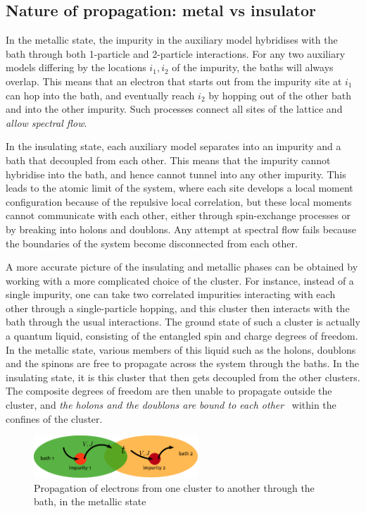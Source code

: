 \documentclass[10pt]{report}
\numberwithin{equation}{section}
\begin{document}
\subsection{Nature of propagation: metal vs insulator}
In the metallic state, the impurity in the auxiliary model hybridises with the bath through both 1-particle and 2-particle interactions. For any two auxiliary models differing by the locations \(i_1, i_2\) of the impurity, the baths will always overlap. This means that an electron that starts out from the impurity site at \(i_1\) can hop into the bath, and eventually reach \(i_2\) by hopping out of the other bath and into the other impurity. Such processes connect all sites of the lattice and \textit{allow spectral flow}.

In the insulating state, each auxiliary model separates into an impurity and a bath that decoupled from each other. This means that the impurity cannot hybridise into the bath, and hence cannot tunnel into any other impurity. This leads to the atomic limit of the system, where each site develops a local moment configuration because of the repulsive local correlation, but these local moments cannot communicate with each other, either through spin-exchange processes or by breaking into holons and doublons. Any attempt at spectral flow fails because the boundaries of the system become disconnected from each other.

A more accurate picture of the insulating and metallic phases can be obtained by working with a more complicated choice of the cluster. For instance, instead of a single impurity, one can take two correlated impurities interacting with each other through a single-particle hopping, and this cluster then interacts with the bath through the usual interactions. The ground state of such a cluster is actually a quantum liquid, consisting of the entangled spin and charge degrees of freedom. In the metallic state, various members of this liquid such as the holons, doublons and the spinons are free to propagate across the system through the baths. In the insulating state, it is this cluster that then gets decoupled from the other clusters. The composite degrees of freedom are then unable to propagate outside the cluster, and \textit{the holons and the doublons are bound to each other}~\cite{Mott_1949} within the confines of the cluster.

\begin{figure}[ht]
	\centering
	\includegraphics[width=0.55\textwidth]{../figures/metal_prop.pdf}
	\caption{Propagation of electrons from one cluster to another through the bath, in the metallic state}
\end{figure}
\end{document}

